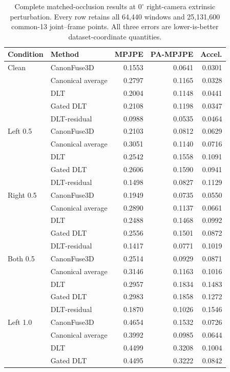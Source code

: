 \begin{table}[htbp]
\centering
\caption{Complete matched-occlusion results at $0^\circ$ right-camera extrinsic perturbation. Every row retains all 64,440 windows and 25,131,600 common-13 joint--frame points. All three errors are lower-is-better dataset-coordinate quantities.}
\label{tab:c07_full_0}
\small
\setlength{\tabcolsep}{4pt}
\begin{tabular}{llrrr}
\toprule
Condition & Method & MPJPE & PA-MPJPE & Accel. \\
\midrule
Clean & CanonFuse3D & 0.1553 & 0.0641 & 0.0301 \\
 & Canonical average & 0.2797 & 0.1165 & 0.0328 \\
 & DLT & 0.2004 & 0.1148 & 0.0441 \\
 & Gated DLT & 0.2108 & 0.1198 & 0.0347 \\
 & DLT-residual & 0.0988 & 0.0535 & 0.0464 \\
Left 0.5 & CanonFuse3D & 0.2103 & 0.0812 & 0.0629 \\
 & Canonical average & 0.3051 & 0.1140 & 0.0716 \\
 & DLT & 0.2542 & 0.1558 & 0.1091 \\
 & Gated DLT & 0.2606 & 0.1590 & 0.0941 \\
 & DLT-residual & 0.1498 & 0.0827 & 0.1129 \\
Right 0.5 & CanonFuse3D & 0.1949 & 0.0735 & 0.0550 \\
 & Canonical average & 0.2890 & 0.1137 & 0.0661 \\
 & DLT & 0.2488 & 0.1468 & 0.0992 \\
 & Gated DLT & 0.2556 & 0.1501 & 0.0872 \\
 & DLT-residual & 0.1417 & 0.0771 & 0.1019 \\
Both 0.5 & CanonFuse3D & 0.2514 & 0.0929 & 0.0871 \\
 & Canonical average & 0.3146 & 0.1163 & 0.1016 \\
 & DLT & 0.2957 & 0.1834 & 0.1483 \\
 & Gated DLT & 0.2983 & 0.1858 & 0.1272 \\
 & DLT-residual & 0.1870 & 0.1026 & 0.1546 \\
Left 1.0 & CanonFuse3D & 0.4654 & 0.1532 & 0.0726 \\
 & Canonical average & 0.3992 & 0.0985 & 0.0644 \\
 & DLT & 0.4499 & 0.3208 & 0.1004 \\
 & Gated DLT & 0.4495 & 0.3222 & 0.0842 \\

\end{tabular}
\end{table}
